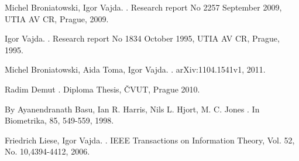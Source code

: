 \documentclass[vecphys]{svmult}
\begin{document}
\small
\begin{thebibliography}{99.}

Michel Broniatowski, Igor Vajda.
.
\newblock Research report No 2257 September 2009, UTIA AV CR, Prague, 2009.

Igor Vajda.
.
\newblock Research report No 1834 October 1995, UTIA AV CR, Prague, 1995.

Michel Broniatowski, Aida Toma, Igor Vajda.
.
\newblock arXiv:1104.1541v1, 2011.

Radim Demut
.
\newblock Diploma Thesis, ČVUT, Prague 2010.

By Ayanendranath Basu, Ian R. Harris, Nils L. Hjort, M. C. Jones
.
\newblock In Biometrika, 85, 549-559, 1998.

Friedrich Liese, Igor Vajda.
.
\newblock IEEE Transactions on Information Theory, Vol. 52, No. 10,4394-4412, 2006.

\end{thebibliography}
\end{document}
